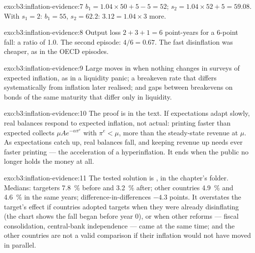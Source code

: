 \begin{solution}{exo:b3:inflation-evidence:7}
$b_1 = 1.04 \times 50 + 5 - 5 = 52$; $s_2 = 1.04 \times 52 + 5 = 59.08$. With $s_1 = 2$: $b_1 = 55$, $s_2 = 62.2$: $3.12 =
1.04 \times 3$ more.
\end{solution}

\begin{solution}{exo:b3:inflation-evidence:8}
Output loss $2 + 3 + 1 = 6$ point-years for a 6-point fall: a ratio of 1.0. The second
episode: $4/6 = 0.67$. The fast disinflation was cheaper, as in the OECD episodes.
\end{solution}

\begin{solution}{exo:b3:inflation-evidence:9}
Large moves in  when nothing changes in surveys of expected
inflation, as in a liquidity panic; a breakeven rate that differs systematically
from inflation later realised; and gaps between breakevens on bonds of the same
maturity that differ only in liquidity.
\end{solution}

\begin{solution}{exo:b3:inflation-evidence:10}
The proof is in the text. If expectations adapt slowly, real balances respond to
expected inflation, not actual: printing faster than expected collects $\mu Ae^{-\alpha\pi^e}$ with
$\pi^e < \mu$, more than the steady-state revenue at $\mu$. As expectations catch up, real
balances fall, and keeping revenue up needs ever faster printing --- the
acceleration of a hyperinflation. It ends when the public no longer holds the
money at all.
\end{solution}

\begin{solution}{exo:b3:inflation-evidence:11}
The tested solution is , in the chapter's
 folder. Medians: targeters 7.8~\% before and 3.2~\% after; other
countries 4.9~\% and 4.6~\% in the same years; difference-in-differences $-4.3$ points.
It overstates the target's effect if countries adopted targets when they were
already disinflating (the chart shows the fall began before year 0), or when other
reforms --- fiscal consolidation, central-bank independence --- came at the same
time; and the other countries are not a valid comparison if their inflation would
not have moved in parallel.
\end{solution}

